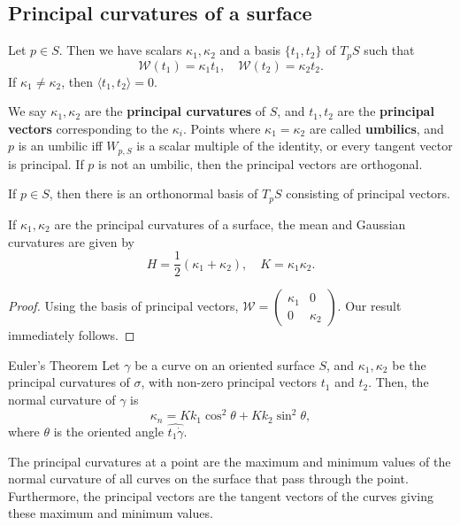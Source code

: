 \subsection{Principal curvatures of a surface}
\begin{prop}
    Let $p \in S$. Then we have scalars $\kappa_1,\kappa_2$ and a basis $\{t_1,t_2\} $ of $T_p S$ such that \[
        \mathcal{W} (t_1)=\kappa_1t_1,\quad \mathcal{W} (t_2)=\kappa_2t_2.
    \] If $\kappa_1\neq \kappa_2$, then $\langle t_1,t_2 \rangle =0$. 
\end{prop}
We say $\kappa_1,\kappa_2$ are the \textbf{principal curvatures} of $S$, and $t_1,t_2$ are the \textbf{principal vectors} corresponding to the $\kappa_i $. Points where $\kappa_1=\kappa_2$ are called \textbf{umbilics}, and $p$ is an umbilic iff $W_{p,S}$ is a scalar multiple of the identity, or every tangent vector is principal. If $p$ is not an umbilic, then the principal vectors are orthogonal.
\begin{cor}
   If $p \in S$, then there is an orthonormal basis of $T_pS$ consisting of principal vectors. 
\end{cor}
\begin{prop}
    If $\kappa_1,\kappa_2$ are the principal curvatures of a surface, the mean and Gaussian curvatures are given by \[
        H= \frac{1}{2}(\kappa_1+\kappa_2),\quad K=\kappa_1\kappa_2.
    \] 
\end{prop}
\begin{proof}
    Using the basis of principal vectors, $\mathcal{W} =\left( 
    \begin{smallmatrix}
        \kappa_1 & 0 \\ 0 & \kappa_2
    \end{smallmatrix}\right) $. Our result immediately follows.
\end{proof}
\begin{namedthm}{Euler's Theorem} 
   Let $\gamma $ be a curve on an oriented surface $S$, and $\kappa_1,\kappa_2$ be the principal curvatures of $\sigma$, with non-zero principal vectors $t_1$ and $t_2$. Then, the normal curvature of $\gamma $ is \[
   \kappa_n =Kk_1\cos ^2 \theta+Kk_2\sin ^2 \theta,
   \] where $\theta$ is the oriented angle $\widehat{t_1\dot \gamma } $.
\end{namedthm}
\begin{cor}
    The principal curvatures at a point are the maximum and minimum values of the normal curvature of all curves on the surface that pass through the point. Furthermore, the principal vectors are the tangent vectors of the curves giving these maximum and minimum values.
\end{cor}
